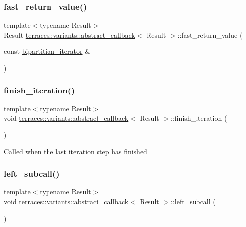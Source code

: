 \subsubsection{\texorpdfstring{fast\+\_\+return\+\_\+value()}{fast\_return\_value()}}
{\footnotesize\ttfamily template$<$typename Result$>$ \\
Result \hyperlink{classterraces_1_1variants_1_1abstract__callback}{terraces\+::variants\+::abstract\+\_\+callback}$<$ Result $>$\+::fast\+\_\+return\+\_\+value (\begin{DoxyParamCaption}\item[{const \hyperlink{classterraces_1_1bipartition__iterator}{bipartition\+\_\+iterator} \&}]{ }\end{DoxyParamCaption})}

\mbox{\label{classterraces_1_1variants_1_1abstract__callback_a620ab0e89816f96ed30f68bb04110c20}} 
\subsubsection{\texorpdfstring{finish\+\_\+iteration()}{finish\_iteration()}}
{\footnotesize\ttfamily template$<$typename Result$>$ \\
void \hyperlink{classterraces_1_1variants_1_1abstract__callback}{terraces\+::variants\+::abstract\+\_\+callback}$<$ Result $>$\+::finish\+\_\+iteration (\begin{DoxyParamCaption}{ }\end{DoxyParamCaption})\hspace{0.3cm}{\ttfamily [inline]}}

Called when the last iteration step has finished. \mbox{\label{classterraces_1_1variants_1_1abstract__callback_a2f05ded7e1d02c569777ca6b47467c34}} 
\subsubsection{\texorpdfstring{left\+\_\+subcall()}{left\_subcall()}}
{\footnotesize\ttfamily template$<$typename Result$>$ \\
void \hyperlink{classterraces_1_1variants_1_1abstract__callback}{terraces\+::variants\+::abstract\+\_\+callback}$<$ Result $>$\+::left\+\_\+subcall (\begin{DoxyParamCaption}{ }\end{DoxyParamCaption})\hspace{0.3cm}{\ttfamily [inline]}}

